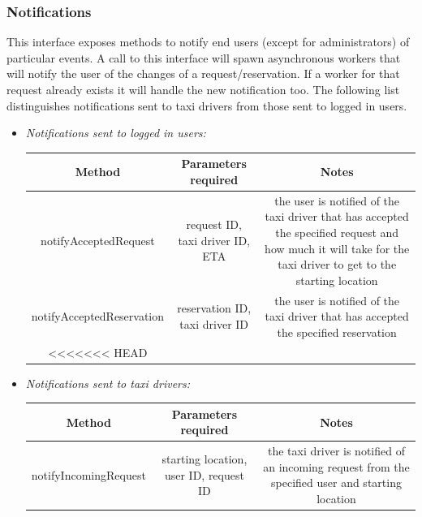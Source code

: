 \documentclass{article}
\begin{document}
\begin{itemize}
			\subsubsection{Notifications} %
			This interface exposes methods to notify end users (except for administrators) of particular events. 
			A call to this interface will spawn asynchronous workers that will notify the user of the changes of a request/reservation.
			If a worker for that request already exists it will handle the new notification too.
			The following list distinguishes notifications sent to taxi drivers from those sent to logged in users.
			\begin{itemize}
				\item \textit{Notifications sent to logged in users:} \\
					\begin{adjustbox}{width=1.2\textwidth}	
						\begin{tabular}{*{3}{c}}
							\toprule
							Method & Parameters required & Notes \\
							\midrule
							notifyAcceptedRequest & request ID, taxi driver ID, ETA & the user is notified of the taxi driver that has accepted the specified request and how much it will take for the taxi driver to get to the starting location\\ 
							notifyAcceptedReservation & reservation ID, taxi driver ID & the user is notified of the taxi driver that has accepted the specified reservation \\
<<<<<<< HEAD
							\bottomrule
						\end{tabular}
					\end{adjustbox}	
				\item \textit{Notifications sent to taxi drivers:} \\
					\begin{adjustbox}{width=1.2\textwidth}	
						\begin{tabular}{*{3}{c}}
							\toprule
							Method & Parameters required & Notes \\
							\midrule
							notifyIncomingRequest & starting location, user ID, request ID & the taxi driver is notified of an incoming request from the specified user and starting location\\ 

\end{tabular}
\end{adjustbox}
\end{itemize}
\end{itemize}
\end{document}
